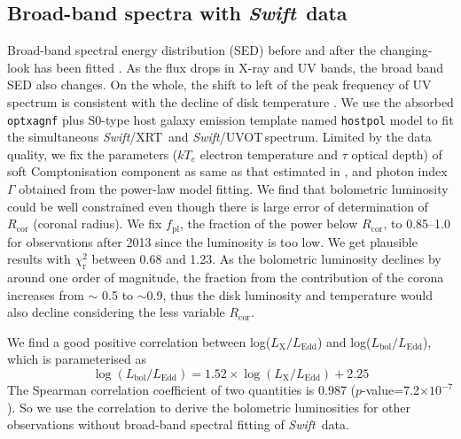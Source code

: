 \documentclass[twocolumn]{aastex63}
\newcommand{\swift}{{\small \it Swift}}
\newcommand{\xrt}{{\small {\it Swift}/XRT}}
\newcommand{\uvot}{{\small {\it Swift}/UVOT}}
\begin{document}
\subsection{Broad-band spectra with \swift\, data}
\label{swift-sed}
Broad-band spectral energy distribution (SED) before and after the changing-look has been fitted \citep[see][]{2016A&A...593L...9H,2018MNRAS.480.3898N}. As the flux drops in X-ray and UV bands, the broad band SED also changes. On the whole, the shift to left of the peak frequency of UV spectrum is consistent with the decline of disk temperature \citep[also described in][]{2016A&A...593L...9H}. We use the absorbed \texttt{optxagnf} plus S0-type host galaxy emission template named \texttt{hostpol} \citep{2007ApJ...663...81P} model to fit the simultaneous \xrt\, and \uvot \,spectrum. Limited by the data quality, we fix the parameters ($kT_e$ electron temperature and $\tau$ optical depth) of soft Comptonisation component as same as that estimated in \citet{2018MNRAS.480.3898N}, and photon index $\Gamma$ obtained from the power-law model fitting. We find that bolometric luminosity could be well constrained even though there is large error of determination of $R_\mathrm{cor}$ (coronal radius). We fix $f_\mathrm{pl}$, the fraction of the power below $R_\mathrm{cor}$, to 0.85--1.0 \citep[see also][]{2018MNRAS.480.3898N} for observations after 2013 since the luminosity is too low. We get plausible results with $\chi^2_\mathrm{r}$ between 0.68 and 1.23. As the bolometric luminosity declines by around one order of magnitude, the fraction from the contribution of the corona increases from $\sim$ 0.5 to $\sim$0.9, thus the disk luminosity and temperature would also decline considering the less variable $R_\mathrm{cor}$. 

We find a good positive correlation between log($L_\mathrm{X}/L_\mathrm{Edd}$) and log($L_\mathrm{bol}/L_\mathrm{Edd}$), which is parameterised as 
\begin{equation}\label{Lbol-LX}
\log(L_\mathrm{bol}/L_\mathrm{Edd})= 1.52 \times \log( L_\mathrm{X}/L_\mathrm{Edd})+2.25
\end{equation} 
 The Spearman correlation coefficient of two quantities is 0.987 ($p$-value=7.2$\times10^{-7}$). So we use the correlation to derive the bolometric luminosities for other observations without broad-band spectral fitting of \swift\, data. 
\end{document}
